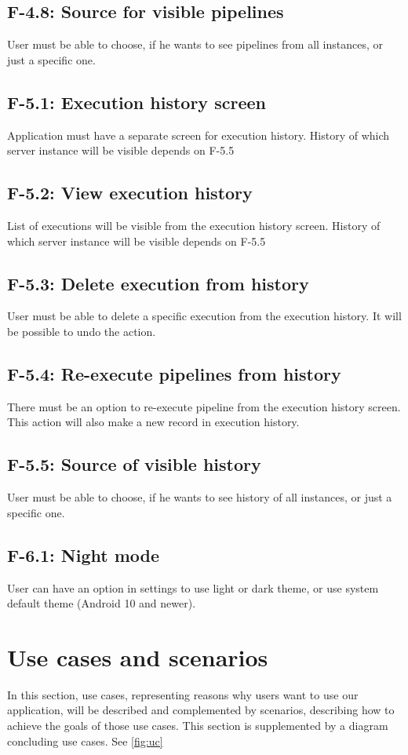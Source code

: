 \subsection*{F-4.8: Source for visible pipelines}
User must be able to choose, if he wants to see pipelines from all instances, or just a specific one.
\subsection*{F-5.1: Execution history screen}
Application must have a separate screen for execution history. History of which server instance will be visible depends on F-5.5
\subsection*{F-5.2: View execution history}
List of executions will be visible from the execution history screen. History of which server instance will be visible depends on F-5.5
\subsection*{F-5.3: Delete execution from history}
User must be able to delete a specific execution from the execution history. It will be possible to undo the action.
\subsection*{F-5.4: Re-execute pipelines from history}
There must be an option to re-execute pipeline from the execution history screen. This action will also make a new record in execution history.
\subsection*{F-5.5: Source of visible history}
User must be able to choose, if he wants to see history of all instances, or just a specific one.
\subsection*{F-6.1: Night mode}
User can have an option in settings to use light or dark theme, or use system default theme (Android 10 and newer).












\section{Use cases and scenarios}
In this section, use cases, representing reasons why users want to use our application, will be described and complemented by scenarios, describing how to achieve the goals of those use cases.
This section is supplemented by a diagram concluding use cases.
See \autoref{fig:uc}


